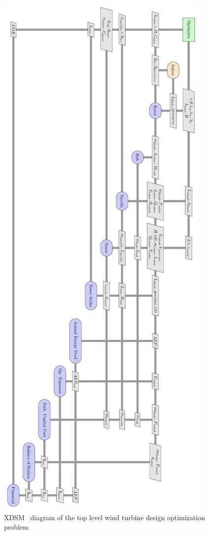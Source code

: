 \documentclass[]{aiaa-tc} %
\begin{document}
    \begin{figure}[!p]
        \centering
        \includegraphics[height=\textheight]{xdsm/wt_xdsm}
        \caption{XDSM~\cite{Lambe2012} diagram of the top level wind turbine design optimization problem}
        \label{fig:xdsm_wt}
    \end{figure}
\end{document}
